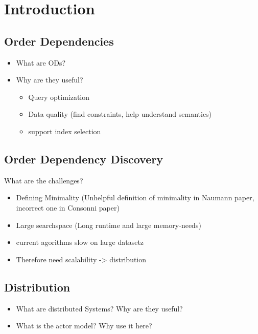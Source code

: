 
\section{Introduction}\label{sec:intro}
\subsection{Order Dependencies}
\begin{itemize}
	\item What are ODs?
	\item Why are they useful?
	\begin{itemize}
		\item Query optimization
		\item Data quality (find constraints, help understand semantics)
		\item support index selection
	\end{itemize}
\end{itemize}	

\subsection{Order Dependency Discovery}
What are the challenges? 
\begin{itemize}
	\item Defining Minimality (Unhelpful definition of minimality in Naumann paper, incorrect one in Consonni paper)	
	\item Large searchspace (Long runtime and large memory-needs)
	\item current agorithms slow on large datasetz 
	\item Therefore need scalability -> distribution
\end{itemize}

\subsection{Distribution}
\begin{itemize}
	\item What are distributed Systems? Why are they useful?
	\item What is the actor model? Why use it here?	
\end{itemize}

